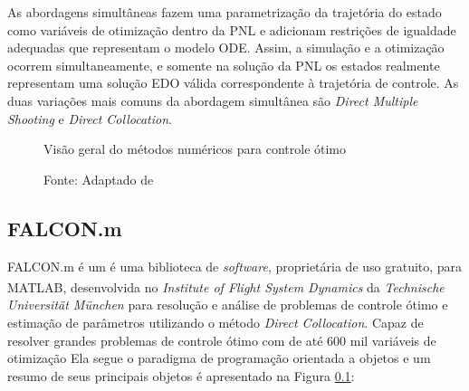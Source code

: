As abordagens simultâneas fazem uma parametrização da trajetória do estado como variáveis ​​de otimização dentro da PNL e adicionam restrições 
de igualdade adequadas que representam o modelo ODE. 
Assim, a simulação e a otimização ocorrem simultaneamente, e somente na solução da PNL os estados realmente representam uma solução EDO válida 
correspondente à trajetória de controle. As duas variações mais comuns da abordagem simultânea são \textit{Direct Multiple Shooting} e \textit{Direct Collocation}.

\begin{figure}[h]
	\centering
	\caption{Visão geral do métodos numéricos para controle ótimo}
	\label{fig:diagrama_metodos_numericos}
	\caption*{\footnotesize Fonte: Adaptado de \citeauthor{article:Diehl}}
\end{figure}



\subsection{FALCON.m}

FALCON.m é um é uma biblioteca de \textit{software}, proprietária de uso gratuito, para MATLAB\textsuperscript{\textregistered}, 
desenvolvida no \textit{Institute of Flight System Dynamics} da \textit{Technische Universit{\"a}t M{\"u}nchen} para resolução e 
análise de problemas de controle ótimo e estimação de parâmetros utilizando o método \textit{Direct Collocation}. Capaz de resolver grandes problemas de controle ótimo com de até 600 mil variáveis de otimização \cite{manual:Falcon, phd:Rieck} 
Ela segue o paradigma de programação orientada a objetos e um resumo de seus principais objetos é apresentado na Figura \ref{}:

